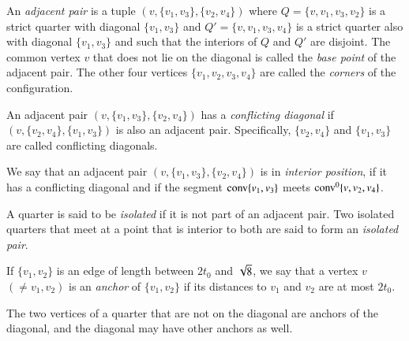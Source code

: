 \begin{definition}\label{def:adj-pair}\label{def:corner}
An {\it adjacent pair} is a tuple
$(v,\{v_1,v_3\},\{v_2,v_4\})$ where $Q=\{v,v_1,v_3,v_2\}$ is a
strict quarter with diagonal $\{v_1,v_3\}$ and
$Q'=\{v,v_1,v_3,v_4\}$ is a strict quarter also with diagonal
$\{v_1,v_3\}$ and such that the interiors of $Q$ and $Q'$ are
disjoint.  The common vertex $v$ that does not lie on the diagonal
is called the {\it base point\/} of the adjacent pair.   The other
four vertices $\{v_1,v_2,v_3,v_4\}$ are called the {\it corners\/}
of the configuration.
%
\end{definition}


\begin{definition}\label{def:conflicting-diag} An adjacent pair
$(v,\{v_1,v_3\},\{v_2,v_4\})$ has a {\it conflicting
diagonal} if
$(v,\{v_2,v_4\},\{v_1,v_3\})$ is also an adjacent pair.
Specifically, $\{v_2,v_4\}$ and $\{v_1,v_3\}$ are called
conflicting diagonals.
\end{definition}

\begin{definition}\label{def:interior-position}  We say
that an adjacent pair $(v,\{v_1,v_3\},\{v_2,v_4\})$ is in {\it
interior position}, if it has a conflicting diagonal and if the
segment ${\operatorname{conv}}\{v_1,v_3\}$ meets
${\operatorname{conv}}^0\{v,v_2,v_4\}$. 
\end{definition}

\begin{definition}
A quarter is said to be {\it isolated} if it is
not part of an adjacent pair.  Two isolated quarters that meet at
a point that is interior to both are said to form an {\it isolated
pair}.
%
\end{definition}


\begin{definition}[anchor] \label{def:anchor}
If $\{v_1,v_2\}$ is an edge of length between $2t_0$ and $\sqrt8$,
we say that a vertex $v$ $(\ne v_1,v_2)$ is an {\it {}
anchor\/} of $\{v_1,v_2\}$ if its distances to $v_1$ and $v_2$ are
at most $2t_0$.
%
\end{definition}

The two vertices of a quarter that are not on the diagonal are
anchors of the diagonal, and the diagonal may have other anchors
as well.

